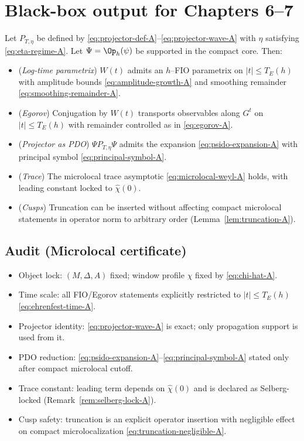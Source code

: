 \section{Black-box output for Chapters 6--7}\label{sec:ch5-summary}

\begin{theorem}\label{thm:projector-structure-A}
Let $P_{T,\eta}$ be defined by \eqref{eq:projector-def-A}--\eqref{eq:projector-wave-A} with $\eta$ satisfying
\eqref{eq:eta-regime-A}$.$ Let $\Psi=\Op_h(\psi)$ be supported in the compact core.
Then:
\begin{itemize}
\item[(i)] (\emph{Log-time parametrix}) $W(t)$ admits an $h$--FIO parametrix on $|t|\le T_E(h)$ with amplitude bounds
\eqref{eq:amplitude-growth-A} and smoothing remainder \eqref{eq:smoothing-remainder-A}.
\item[(ii)] (\emph{Egorov}) Conjugation by $W(t)$ transports observables along $G^t$ on $|t|\le T_E(h)$ with remainder
controlled as in \eqref{eq:egorov-A}.
\item[(iii)] (\emph{Projector as PDO}) $\Psi P_{T,\eta}\Psi$ admits the expansion \eqref{eq:psido-expansion-A} with principal
symbol \eqref{eq:principal-symbol-A}.
\item[(iv)] (\emph{Trace}) The microlocal trace asymptotic \eqref{eq:microlocal-weyl-A} holds, with leading constant locked to
$\widehat\chi(0)$.
\item[(v)] (\emph{Cusps}) Truncation can be inserted without affecting compact microlocal statements in operator norm to
arbitrary order (Lemma~\ref{lem:truncation-A}).
\end{itemize}
\end{theorem}

\subsection*{Audit (Microlocal certificate)}\label{audit:ch5}

\begin{itemize}
\item[(M1)] Object lock: $(M,\Delta,A)$ fixed; window profile $\widehat\chi$ fixed by \eqref{eq:chi-hat-A}.
\item[(M2)] Time scale: all FIO/Egorov statements explicitly restricted to $|t|\le T_E(h)$ \eqref{eq:ehrenfest-time-A}.
\item[(M3)] Projector identity: \eqref{eq:projector-wave-A} is exact; only propagation support is used from it.
\item[(M4)] PDO reduction: \eqref{eq:psido-expansion-A}--\eqref{eq:principal-symbol-A} stated only after compact microlocal cutoff.
\item[(M5)] Trace constant: leading term depends on $\widehat\chi(0)$ and is declared as Selberg-locked (Remark~\ref{rem:selberg-lock-A}).
\item[(M6)] Cusp safety: truncation is an explicit operator insertion with negligible effect on compact microlocalization
\eqref{eq:truncation-negligible-A}.
\end{itemize}

